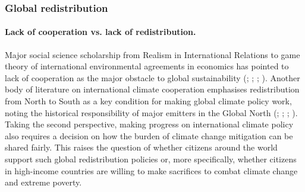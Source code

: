 

\subsubsection{Global redistribution}\label{subsubsec:literature_redistribution}

\paragraph{Lack of cooperation vs. lack of redistribution.}
Major social science scholarship from Realism in International Relations to game theory of international environmental agreements in economics has pointed to lack of cooperation as the major obstacle to global sustainability (; ; ; ). Another body of literature on international climate cooperation emphasises redistribution from North to South as a key condition for making global climate policy work, noting the historical responsibility of major emitters in the Global North (; ; ; ).  
Taking the second perspective, making progress on international climate policy also requires a decision on how the burden of climate change mitigation  can be shared fairly. This raises the question of whether citizens around the world support such global redistribution policies or, more specifically, whether citizens in high-income countries are willing to make sacrifices to combat climate change and extreme poverty.

